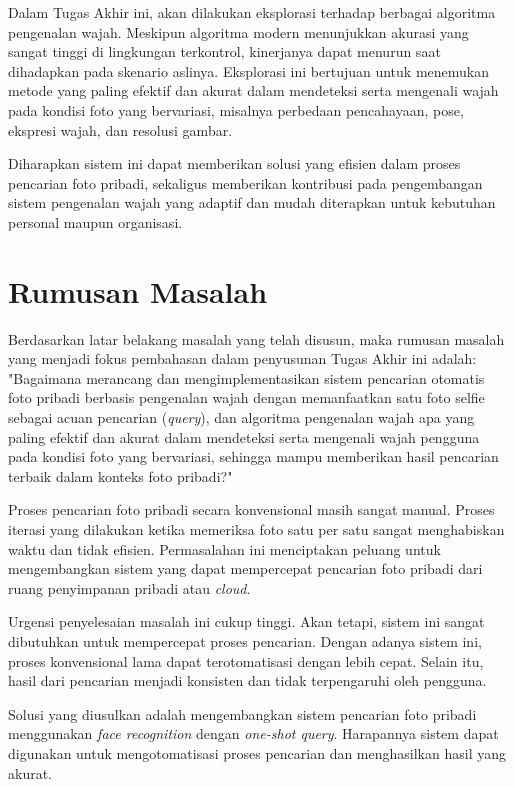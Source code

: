 Dalam Tugas Akhir ini, akan dilakukan eksplorasi terhadap berbagai algoritma pengenalan wajah. Meskipun algoritma modern menunjukkan akurasi yang sangat tinggi di lingkungan terkontrol, kinerjanya dapat menurun saat dihadapkan pada skenario aslinya. Eksplorasi ini bertujuan untuk menemukan metode yang paling efektif dan akurat dalam mendeteksi serta mengenali wajah pada kondisi foto yang bervariasi, misalnya perbedaan pencahayaan, pose, ekspresi wajah, dan resolusi gambar.

Diharapkan sistem ini dapat memberikan solusi yang efisien dalam proses pencarian foto pribadi, sekaligus memberikan kontribusi pada pengembangan sistem pengenalan wajah yang adaptif dan mudah diterapkan untuk kebutuhan personal maupun organisasi.

\section{Rumusan Masalah}
Berdasarkan latar belakang masalah yang telah disusun, maka rumusan masalah yang menjadi fokus pembahasan dalam penyusunan Tugas Akhir ini adalah: "Bagaimana merancang dan mengimplementasikan sistem pencarian otomatis foto pribadi berbasis pengenalan wajah dengan memanfaatkan satu foto selfie sebagai acuan pencarian (\textit{query}), dan algoritma pengenalan wajah apa yang paling efektif dan akurat dalam mendeteksi serta mengenali wajah pengguna pada kondisi foto yang bervariasi, sehingga mampu memberikan hasil pencarian terbaik dalam konteks foto pribadi?"

Proses pencarian foto pribadi secara konvensional masih sangat manual. Proses iterasi yang dilakukan ketika memeriksa foto satu per satu sangat menghabiskan waktu dan tidak efisien. Permasalahan ini menciptakan peluang untuk mengembangkan sistem yang dapat mempercepat pencarian foto pribadi dari ruang penyimpanan pribadi atau \textit{cloud}.

Urgensi penyelesaian masalah ini cukup tinggi. Akan tetapi, sistem ini sangat dibutuhkan untuk mempercepat proses pencarian. Dengan adanya sistem ini, proses konvensional lama dapat terotomatisasi dengan lebih cepat. Selain itu, hasil dari pencarian menjadi konsisten dan tidak terpengaruhi oleh pengguna.

Solusi yang diusulkan adalah mengembangkan sistem pencarian foto pribadi menggunakan \textit{face recognition} dengan \textit{one-shot query}. Harapannya sistem dapat digunakan untuk mengotomatisasi proses pencarian dan menghasilkan hasil yang akurat.


